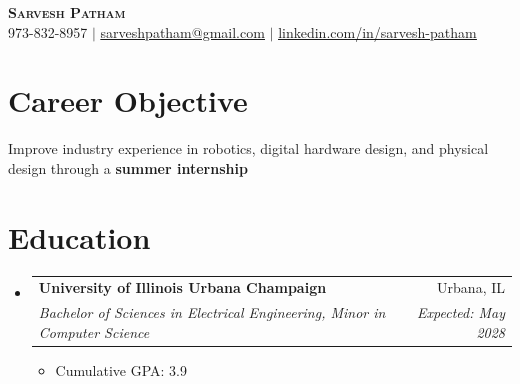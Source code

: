 \documentclass[letterpaper,11pt]{article}
\makeatletter
\newcommand{\resumeItem}[1]{
  \item\small{
    {#1 \vspace{-2pt}}
  }
}
\newcommand{\resumeSubheading}[4]{
  \vspace{-2pt}\item
    \begin{tabular*}{0.97\textwidth}[t]{l@{\extracolsep{\fill}}r}
      \textbf{#1} & #2 \\
      \textit{\small#3} & \textit{\small #4} \\
    \end{tabular*}\vspace{-7pt}
}
\newcommand{\resumeSubHeadingListStart}{\begin{itemize}[leftmargin=0.15in, label={}]}
\newcommand{\resumeSubHeadingListEnd}{\end{itemize}}
\newcommand{\resumeItemListStart}{\begin{itemize}}
\newcommand{\resumeItemListEnd}{\end{itemize}\vspace{-5pt}}
\makeatother
\begin{document}
\begin{center}
    \textbf{\Huge \scshape Sarvesh Patham} \\ \vspace{1pt}
    \small 973-832-8957 $|$ \href{mailto:sarveshpatham@gmail.com}{\underline{sarveshpatham@gmail.com}} $|$ 
    \href{http://www.linkedin.com/in/sarvesh-patham}
{\underline{linkedin.com/in/sarvesh-patham}}
\end{center}

\section{Career Objective}
    {\small Improve industry experience in robotics, digital hardware design, and physical design through a \textbf{summer internship}\par}
    

\section{Education}
  \resumeSubHeadingListStart
    \resumeSubheading
      {University of Illinois Urbana Champaign}{Urbana, IL}
      {Bachelor of Sciences in Electrical Engineering, Minor in Computer Science}{Expected: May 2028}
        \resumeItemListStart
        \resumeItem{Cumulative GPA: 3.9}
        \resumeItemListEnd
  \resumeSubHeadingListEnd


\end{document}
